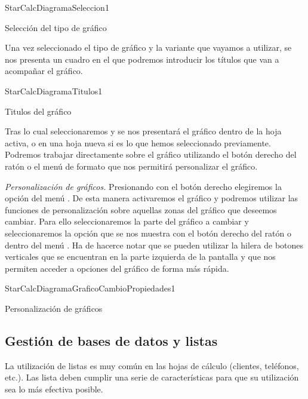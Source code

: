 \begin{figura}{StarCalcDiagramaSeleccion}{1}
\caption{Selección del tipo de gráfico}
\end{figura}

 
Una vez seleccionado el tipo de gráfico y la variante que vayamos a utilizar,
se nos presenta un cuadro en el que podremos introducir los títulos que van
a acompañar el gráfico. 

\begin{figura}{StarCalcDiagramaTitulos}{1}
\caption{Titulos del gráfico}
\end{figura}


Tras lo cual seleccionaremos  y se nos presentará el gráfico
dentro de la hoja activa,  o en una hoja nueva si es lo que hemos seleccionado
previamente.  Podremos trabajar directamente sobre el gráfico utilizando el
botón derecho del ratón o el menú  de formato que nos permitirá personalizar
el gráfico. 

\emph{Personalización de gráficos.}
Presionando con el botón derecho elegiremos la opción del menú
. De esta manera  activaremos el gráfico y podremos utilizar
las funciones de personalización sobre  aquellas zonas del gráfico que
deseemos cambiar. Para ello seleccionaremos la parte  del gráfico a cambiar y
seleccionaremos la opción  que se nos  muestra
con el botón derecho del ratón o dentro del menú .  Ha de
hacerce notar que se pueden utilizar la hilera de botones verticales que se
encuentran  en la parte izquierda de la pantalla y que nos permiten acceder a
opciones del gráfico  de forma más rápida.

\begin{figura}{StarCalcDiagramaGraficoCambioPropiedades}{1}
\caption{Personalización de gráficos}
\label{fig:StarCalcDiagramaGraficoCambioPropiedades}
\end{figura}




\subsection{Gestión de bases de datos y listas} 
La utilización de listas es muy común en las hojas de cálculo (clientes, teléfonos,
etc.). Las lista deben cumplir una serie de características para que su utilización
sea lo más efectiva posible.

